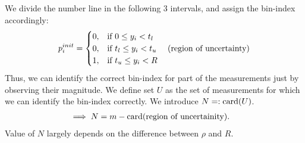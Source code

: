 %			
We divide the number line in the following $3$ intervals, and assign the bin-index accordingly:
\begin{equation}
{p}^{init}_{i} = 
\begin{cases}
0,& \text{if } 0\leq y_i < t_l \\
0,& \text{if } t_l\leq y_i < t_u ~~~~ \textnormal{(region of uncertainty)} \\
1,& \text{if } t_u \leq y_i < R \\
\end{cases}
\label{eq:rcm}
\end{equation}
Thus, we can identify the correct bin-index for part of the measurements just by observing their magnitude. We define set $U$ as the set of measurements for which we can identify the bin-index correctly. We introduce $N=: \mathrm{card}(U)$.
\begin{align*}
\implies N & =  m - \mathrm{card}(\textnormal{region of uncertainity}).
\end{align*}
Value of $N$ largely depends on the difference between $\rho$ and $R$.


